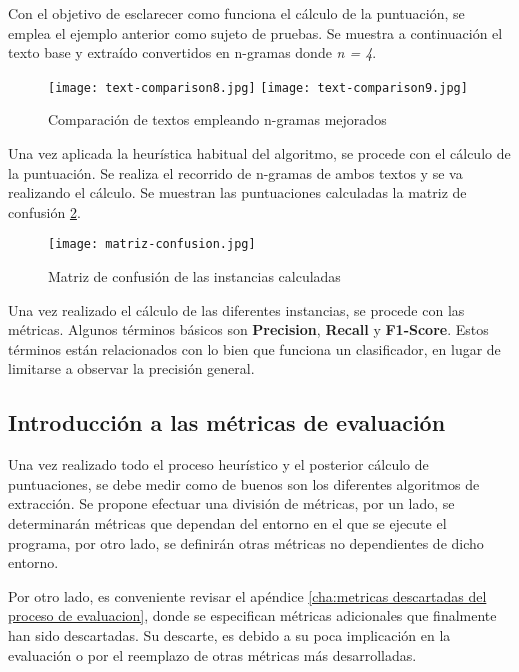 Con el objetivo de esclarecer como funciona el cálculo de la puntuación, se emplea el ejemplo anterior
como sujeto de pruebas. Se muestra a continuación el texto base y extraído convertidos en n-gramas donde 
\emph{n = 4}.

\begin{figure}[tphb]
  \centering
  \texttt{[image: text-comparison8.jpg]}
  \texttt{[image: text-comparison9.jpg]}
  \caption{Comparación de textos empleando n-gramas mejorados}
  \label{img:comparacion de textos empleando n-gramas mejorados}
\end{figure}

Una vez aplicada la heurística habitual del algoritmo, se procede con el cálculo de la puntuación. Se
realiza el recorrido de n-gramas de ambos textos y se va realizando el cálculo. Se muestran las puntuaciones 
calculadas la matriz de confusión \ref{img:matriz de confusion de las instancias calculadas}.

\begin{figure}[tphb]
  \centering
  \texttt{[image: matriz-confusion.jpg]}
  \caption{Matriz de confusión de las instancias calculadas}
  \label{img:matriz de confusion de las instancias calculadas}
\end{figure}

Una vez realizado el cálculo de las diferentes instancias, se procede con las métricas. Algunos términos 
básicos son \textbf{Precision}, \textbf{Recall} y \textbf{F1-Score}. Estos términos están relacionados con 
lo bien que funciona un clasificador, en lugar de limitarse a observar la precisión general.

\subsection{Introducción a las métricas de evaluación}
\label{subsec:introduccion a las metricas de evaluacion}

Una vez realizado todo el proceso heurístico y el posterior cálculo de puntuaciones, se debe medir como de
buenos son los diferentes algoritmos de extracción. Se propone efectuar una división de métricas, por un
lado, se determinarán métricas que dependan del entorno en el que se ejecute el programa, por otro lado,
se definirán otras métricas no dependientes de dicho entorno. 

Por otro lado, es conveniente revisar el apéndice \ref{cha:metricas descartadas del proceso de evaluacion},
donde se especifican métricas adicionales que finalmente han sido descartadas. Su descarte, es debido a su 
poca implicación en la evaluación o por el reemplazo de otras métricas más desarrolladas.

